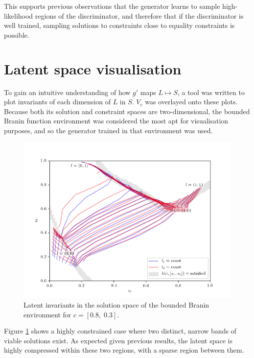\documentclass[../../main.tex]{subfiles}
\begin{document}
This supports previous observations that the generator learns to sample high-likelihood regions of the discriminator, and therefore that if the discriminator is well trained, sampling solutions to constraints close to equality constraints is possible.

\section{Latent space visualisation} \label{section:latentSpaceVisualisation}

To gain an intuitive understanding of how $g'$ maps $L\mapsto S$, a tool was written to plot invariants of each dimension of $L$ in $S$.
$V_c$ was overlayed onto these plots.
Because both its solution and constraint spaces are two-dimensional, the bounded Branin function environment was considered the most apt for visualisation purposes, and so the generator trained in that environment was used.
\begin{figure}[H]
    \begin{center}
    \includegraphics[width=\textwidth]{latentPlot0803}
    \caption{
        Latent invariants in the solution space of the bounded Branin environment for $c=[0.8,\;0.3]$.
    }
    \label{fig:latentPlot0803}
    \end{center}
\end{figure}
Figure \ref{fig:latentPlot0803} shows a highly constrained case where two distinct, narrow bands of viable solutions exist.
As expected given previous results, the latent space is highly compressed within these two regions, with a sparse region between them.
\end{document}
